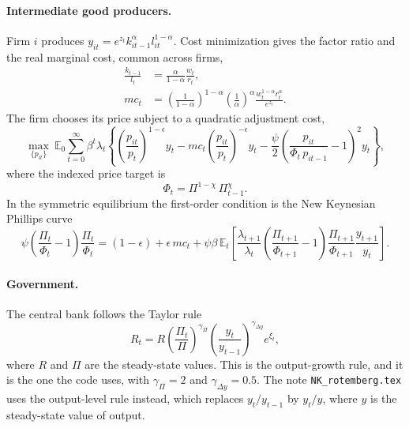 \documentclass[11pt]{article}
\begin{document}
\paragraph{Intermediate good producers.} Firm $i$ produces $y_{it} = e^{z_t} k_{it-1}^{\alpha} l_{it}^{1-\alpha}$. Cost minimization gives the factor ratio and the real marginal cost, common across firms,
\begin{align}
\frac{k_{t-1}}{l_t} &= \frac{\alpha}{1-\alpha} \frac{w_t}{r_t}, \\
mc_t &= \left( \frac{1}{1-\alpha} \right)^{1-\alpha} \left( \frac{1}{\alpha} \right)^{\alpha} \frac{w_t^{1-\alpha} r_t^{\alpha}}{e^{z_t}} .
\end{align}
The firm chooses its price subject to a quadratic adjustment cost,
\begin{equation*}
\max_{\{p_{it}\}} \ \mathbb{E}_0 \sum_{t=0}^{\infty} \beta^t \lambda_t \left\{ \left( \frac{p_{it}}{p_t} \right)^{1-\epsilon} y_t - mc_t \left( \frac{p_{it}}{p_t} \right)^{-\epsilon} y_t - \frac{\psi}{2} \left( \frac{p_{it}}{\Phi_t\, p_{it-1}} - 1 \right)^2 y_t \right\},
\end{equation*}
where the indexed price target is
\begin{equation}
\Phi_t = \Pi^{1-\chi}\, \Pi_{t-1}^{\chi} .
\end{equation}
In the symmetric equilibrium the first-order condition is the New Keynesian Phillips curve
\begin{equation}
\psi \left( \frac{\Pi_t}{\Phi_t} - 1 \right) \frac{\Pi_t}{\Phi_t}
= (1 - \epsilon) + \epsilon\, mc_t
+ \psi \beta\, \mathbb{E}_t \left[ \frac{\lambda_{t+1}}{\lambda_t} \left( \frac{\Pi_{t+1}}{\Phi_{t+1}} - 1 \right) \frac{\Pi_{t+1}}{\Phi_{t+1}} \frac{y_{t+1}}{y_t} \right] .
\end{equation}

\paragraph{Government.} The central bank follows the Taylor rule
\begin{equation}
R_t = R \left( \frac{\Pi_t}{\Pi} \right)^{\gamma_\Pi} \left( \frac{y_t}{y_{t-1}} \right)^{\gamma_{\Delta y}} e^{\xi_t},
\end{equation}
where $R$ and $\Pi$ are the steady-state values. This is the output-growth rule, and it is the one the code uses, with $\gamma_\Pi = 2$ and $\gamma_{\Delta y} = 0.5$. The note \texttt{NK\_rotemberg.tex} uses the output-level rule instead, which replaces $y_t/y_{t-1}$ by $y_t/y$, where $y$ is the steady-state value of output.
\end{document}
